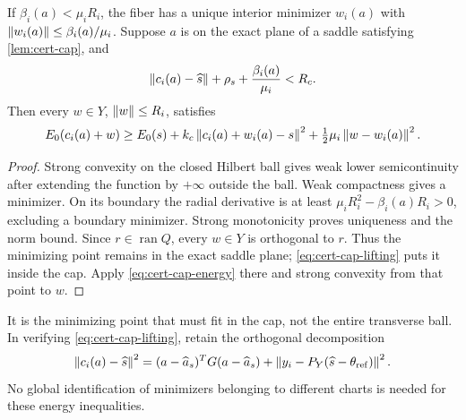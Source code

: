 \begin{lemma}\label{lem:cert-fiber}
If $\beta_i(a)<\mu_iR_i$, the fiber has a unique interior minimizer
$w_i(a)$ with $\left\lVert w_i(a)\right\rVert\le\beta_i(a)/\mu_i$. Suppose $a$ is on
the exact plane of a saddle satisfying \cref{lem:cert-cap}, and
\begin{equation}\label{eq:cert-cap-lifting}
 \left\lVert c_i(a)-\widehat s\right\rVert+\rho_s+\frac{\beta_i(a)}{\mu_i}<R_c.
\end{equation}
Then every $w\in Y$, $\left\lVert w\right\rVert\le R_i$, satisfies
\begin{equation}\label{eq:cert-full-fiber-cap}
 E_0(c_i(a)+w)\ge E_0(s)
  +k_c\left\lVert c_i(a)+w_i(a)-s\right\rVert^2
  +\tfrac12\mu_i\left\lVert w-w_i(a)\right\rVert^2.
\end{equation}
\end{lemma}
\begin{proof}
Strong convexity on the closed Hilbert ball gives weak lower
semicontinuity after extending the function by $+\infty$ outside the
ball. Weak compactness gives a minimizer. On its boundary the radial
derivative is at least $\mu_iR_i^2-\beta_i(a)R_i>0$, excluding a
boundary minimizer. Strong monotonicity proves uniqueness and the norm
bound. Since $r\in\operatorname{ran}Q$, every $w\in Y$ is orthogonal
to $r$. Thus the minimizing point remains in the exact saddle plane;
\eqref{eq:cert-cap-lifting} puts it inside the cap. Apply
\eqref{eq:cert-cap-energy} there and strong convexity from that point
to $w$.
\end{proof}

It is the minimizing point that must fit in the cap, not the entire
transverse ball. In verifying \eqref{eq:cert-cap-lifting}, retain the
orthogonal decomposition
\[
 \left\lVert c_i(a)-\widehat s\right\rVert^2
 =(a-\widehat a_s)^TG(a-\widehat a_s)
   +\left\lVert y_i-P_Y(\widehat s-\theta_{\rm ref})\right\rVert^2.
\]
No global identification of minimizers belonging to different charts
is needed for these energy inequalities.

